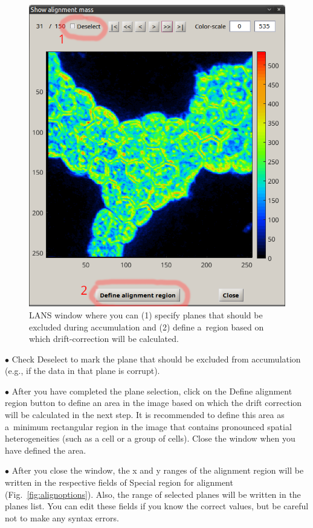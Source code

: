 \documentclass[a4paper, 11pt]{article}
\newcommand{\lans}[1]{{\color{magenta}#1}}
\newcommand{\lanscb}[1]{{\color{darkgreen}#1}}
\newcommand{\lanstf}[1]{{\color{cyan}#1}}
\newcounter{step}
\newcommand\bul{\vskip5pt\noindent$\bullet${ }}
\begin{document}
\begin{figure}[!ht]
\centering
\includegraphics[scale=0.4]{figs3/LANS-show-alignment-mass}
\caption{\label{fig:show-alignment-mass}%
LANS window where you can (1) specify planes that should be excluded during accumulation and (2) define a~region based on which drift-correction will be calculated.}
\end{figure}

\bul Check \lanscb{Deselect} to mark the plane that should be excluded from accumulation (e.g., if the data in that plane is corrupt).

\bul After you have completed the plane selection, click on the \lans{Define alignment region} button to define an area in the image based on which the drift correction will be calculated in the next step. It is recommended to define this area as a~minimum rectangular region in the image that contains pronounced spatial heterogeneities (such as a cell or a group of cells). Close the window when you have defined the area.

\bul After you close the window, the x and y ranges of the alignment region will be written in the respective fields of \lanstf{Special region for alignment} (Fig.~\ref{fig:alignoptions}). Also, the range of selected planes will be written in the \lanstf{planes} list. You can edit these fields if you know the correct values, but be careful not to make any syntax errors. 
\end{document}
